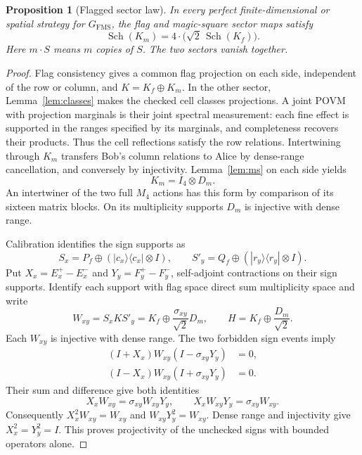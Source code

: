 \documentclass[11pt]{article}
\newtheorem{proposition}[theorem]{Proposition}
\theoremstyle{definition}
\DeclareMathOperator{\Sch}{Sch}
\newcommand{\FMS}{G_{\mathrm{FMS}}}
\newcommand{\mult}[2]{#1\mathbin{\cdot}#2}
\begin{document}
\begin{proposition}[Flagged sector law]\label{prop:sector}
In every perfect finite-dimensional or spatial strategy for $\FMS$, the flag and magic-square sector maps satisfy
\begin{equation}\label{eq:sectorlaw}
\Sch(K_m)=\mult{4}{\bigl(\sqrt2\,\Sch(K_f)\bigr)}.
\end{equation}
Here $\mult{m}{S}$ means $m$ copies of $S$. The two sectors vanish together.
\end{proposition}
\begin{proof}
Flag consistency gives a common flag projection on each side, independent of the row or column, and $K=K_f\oplus K_m$. In the other sector, Lemma~\ref{lem:classes} makes the checked cell classes projections. A joint POVM with projection marginals is their joint spectral measurement: each fine effect is supported in the ranges specified by its marginals, and completeness recovers their products. Thus the cell reflections satisfy the row relations. Intertwining through $K_m$ transfers Bob's column relations to Alice by dense-range cancellation, and conversely by injectivity. Lemma~\ref{lem:ms} on each side yields
\[
K_m=I_4\otimes D_m.
\]
An intertwiner of the two full $M_4$ actions has this form by comparison of its sixteen matrix blocks. On its multiplicity supports $D_m$ is injective with dense range.

Calibration identifies the sign supports as
\[
S_x=P_f\oplus(|c_x\rangle\langle c_x|\otimes I),\qquad
S'_y=Q_f\oplus(|r_y\rangle\langle r_y|\otimes I).
\]
Put $X_x=E_x^+-E_x^-$ and $Y_y=F_y^+-F_y^-$, self-adjoint contractions on their sign supports. Identify each support with flag space direct sum multiplicity space and write
\begin{equation}\label{eq:bridge}
W_{xy}=S_xKS'_y=K_f\oplus\frac{\sigma_{xy}}{\sqrt2}D_m,
\qquad H=K_f\oplus\frac{D_m}{\sqrt2}.
\end{equation}
Each $W_{xy}$ is injective with dense range. The two forbidden sign events imply
\begin{align*}
(I+X_x)W_{xy}(I-\sigma_{xy}Y_y)&=0,\\
(I-X_x)W_{xy}(I+\sigma_{xy}Y_y)&=0.
\end{align*}
Their sum and difference give both identities
\begin{equation}\label{eq:twoidentities}
X_xW_{xy}=\sigma_{xy}W_{xy}Y_y,\qquad
X_xW_{xy}Y_y=\sigma_{xy}W_{xy}.
\end{equation}
Consequently $X_x^2W_{xy}=W_{xy}$ and $W_{xy}Y_y^2=W_{xy}$. Dense range and injectivity give $X_x^2=Y_y^2=I$. This proves projectivity of the unchecked signs with bounded operators alone.


\end{proof}
\end{document}
